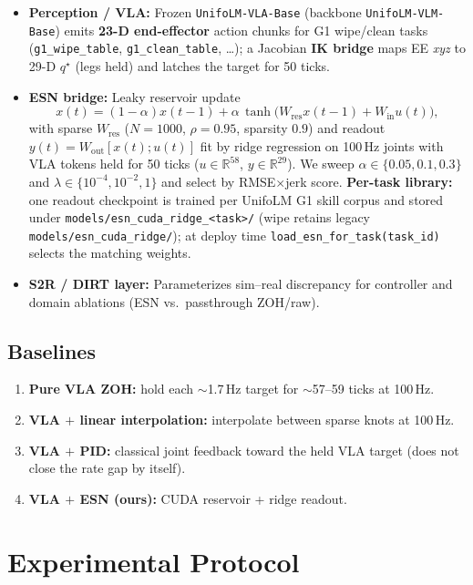 \documentclass[conference]{IEEEtran}
\begin{document}
\begin{itemize}
  \item \textbf{Perception / VLA:} Frozen \texttt{UnifoLM-VLA-Base} (backbone \texttt{UnifoLM-VLM-Base}) emits \textbf{23-D end-effector} action chunks for G1 wipe/clean tasks (\texttt{g1\_wipe\_table}, \texttt{g1\_clean\_table}, \ldots); a Jacobian \textbf{IK bridge} maps EE \emph{xyz} to 29-D $q^{\star}$ (legs held) and latches the target for 50 ticks.
  \item \textbf{ESN bridge:} Leaky reservoir update
  \[
  x(t)=(1-\alpha)x(t-1)+\alpha\,\tanh\!\big(W_{\mathrm{res}}x(t-1)+W_{\mathrm{in}}u(t)\big),
  \]
  with sparse $W_{\mathrm{res}}$ ($N{=}1000$, $\rho{=}0.95$, sparsity $0.9$) and readout
  $y(t)=W_{\mathrm{out}}[x(t);u(t)]$ fit by ridge regression on 100\,Hz joints with VLA tokens held for 50 ticks ($u\in\mathbb{R}^{58}$, $y\in\mathbb{R}^{29}$).
  We sweep $\alpha\in\{0.05,0.1,0.3\}$ and $\lambda\in\{10^{-4},10^{-2},1\}$ and select by RMSE$\times$jerk score.
  \textbf{Per-task library:} one readout checkpoint is trained per UnifoLM G1 skill corpus and stored under \texttt{models/esn\_cuda\_ridge\_\textless task\textgreater/} (wipe retains legacy \texttt{models/esn\_cuda\_ridge/}); at deploy time \texttt{load\_esn\_for\_task(task\_id)} selects the matching weights.
  \item \textbf{S2R / DIRT layer:} Parameterizes sim--real discrepancy for controller and domain ablations (ESN vs.\ passthrough ZOH/raw).
\end{itemize}

\subsection{Baselines}
\begin{enumerate}
  \item \textbf{Pure VLA ZOH:} hold each $\sim$1.7\,Hz target for $\sim$57--59 ticks at 100\,Hz.
  \item \textbf{VLA $+$ linear interpolation:} interpolate between sparse knots at 100\,Hz.
  \item \textbf{VLA $+$ PID:} classical joint feedback toward the held VLA target (does not close the rate gap by itself).
  \item \textbf{VLA $+$ ESN (ours):} CUDA reservoir + ridge readout.
\end{enumerate}

\section{Experimental Protocol}
\end{document}

